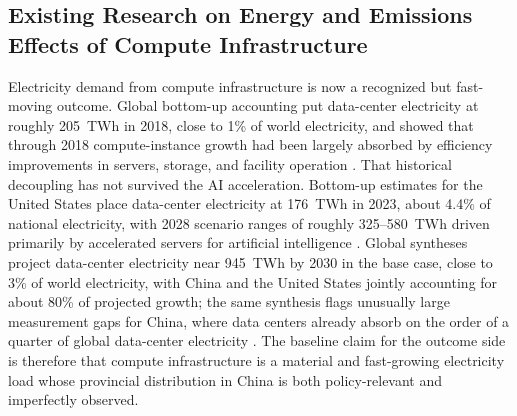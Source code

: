 \documentclass[12pt,a4paper]{article}
\begin{document}
\subsection{Existing Research on Energy and Emissions Effects of
Compute Infrastructure}
%
%
%
%

Electricity demand from compute infrastructure is now a recognized
but fast-moving outcome. Global bottom-up accounting put data-center
electricity at roughly 205~TWh in 2018, close to 1\% of world
electricity, and showed that through 2018 compute-instance growth had
been largely absorbed by efficiency improvements in servers, storage,
and facility operation
\citep{masanetetal-2020-recalibratingglobaldata}. That historical
decoupling has not survived the AI acceleration. Bottom-up estimates
for the United States place data-center electricity at 176~TWh in
2023, about 4.4\% of national electricity, with 2028 scenario ranges
of roughly 325--580~TWh driven primarily by accelerated servers for
artificial intelligence \citep{shehabietal-2024-2024unitedstates}.
Global syntheses project data-center electricity near 945~TWh by 2030
in the base case, close to 3\% of world electricity, with China and
the United States jointly accounting for about 80\% of projected
growth; the same synthesis flags unusually large measurement gaps for
China, where data centers already absorb on the order of a quarter of
global data-center electricity \citep{internationalenergyagency-2025-energyai}.
The baseline claim for the outcome side is therefore that compute
infrastructure is a material and fast-growing electricity load whose
provincial distribution in China is both policy-relevant and
imperfectly observed.
\end{document}
